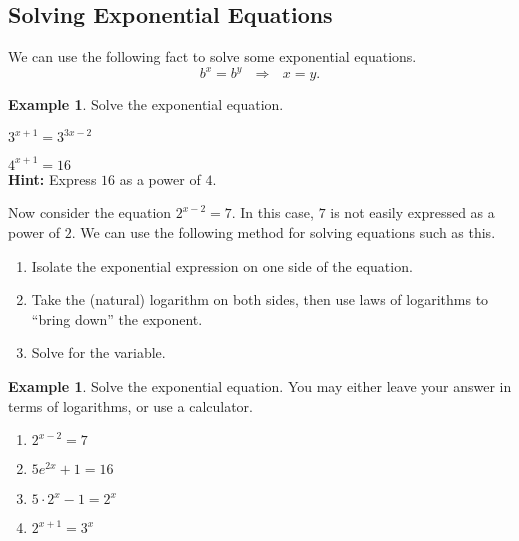 \documentclass[letterpaper,12pt,oneside]{book}
\theoremstyle{definition}
\newtheorem{example}[theorem]{Example}
\begin{document}
{\newpage

\subsection*{Solving Exponential Equations}

We can use the following fact to solve some exponential equations.
\[
b^x=b^y\ \ \ \Rightarrow \ \ \ x=y.
\]


\begin{example}
Solve the exponential equation.
\begin{enumerate}
\begin{multicols}{2}
\item $3^{x+1}=3^{3x-2}$
\item $4^{x+1}=16$\\  \textbf{Hint:} Express $16$ as a power of $4$.
\end{multicols}
\end{enumerate}
\end{example}

\vfill

\noindent
Now consider the equation $2^{x-2}=7.$  In this case, $7$ is not easily expressed as a power of $2$.  We can use the following method for solving equations such as this.

\begin{enumerate}[label=\arabic*.]
\item Isolate the exponential expression on one side of the equation.
\item Take the (natural) logarithm on both sides, then use laws of logarithms to ``bring down'' the exponent.
\item Solve for the variable.
\end{enumerate}

\begin{example}
Solve the exponential equation.  You may either leave your answer in terms of logarithms, or use a calculator.
\begin{multicols}{2}
\begin{enumerate}
\item $2^{x-2}=7$
\vspace{4cm}
\item $5e^{2x}+1=16$
\vspace{4cm}
\item $5\cdot 2^x-1=2^x$
\vspace{4cm}
\item $2^{x+1}=3^x$
\vspace{4cm}
\vspace*{\fill}
\end{enumerate}
\end{multicols}
\end{example}

}
\end{document}
